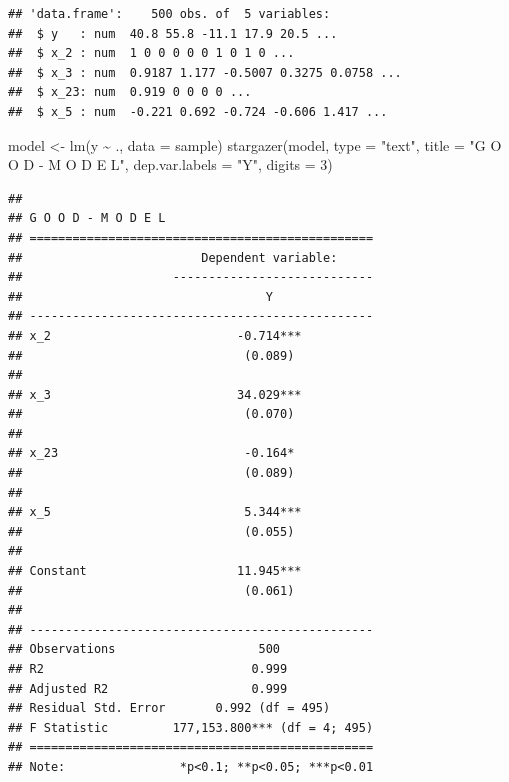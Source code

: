 \documentclass[
]{book}
\newenvironment{Shaded}{\begin{snugshade}}{\end{snugshade}}
\newcommand{\AttributeTok}[1]{\textcolor[rgb]{0.77,0.63,0.00}{#1}}
\newcommand{\DecValTok}[1]{\textcolor[rgb]{0.00,0.00,0.81}{#1}}
\newcommand{\FunctionTok}[1]{\textcolor[rgb]{0.00,0.00,0.00}{#1}}
\newcommand{\NormalTok}[1]{#1}
\newcommand{\OtherTok}[1]{\textcolor[rgb]{0.56,0.35,0.01}{#1}}
\newcommand{\SpecialCharTok}[1]{\textcolor[rgb]{0.00,0.00,0.00}{#1}}
\newcommand{\StringTok}[1]{\textcolor[rgb]{0.31,0.60,0.02}{#1}}
\begin{document}
\begin{verbatim}
## 'data.frame':    500 obs. of  5 variables:
##  $ y   : num  40.8 55.8 -11.1 17.9 20.5 ...
##  $ x_2 : num  1 0 0 0 0 0 1 0 1 0 ...
##  $ x_3 : num  0.9187 1.177 -0.5007 0.3275 0.0758 ...
##  $ x_23: num  0.919 0 0 0 0 ...
##  $ x_5 : num  -0.221 0.692 -0.724 -0.606 1.417 ...
\end{verbatim}

\begin{Shaded}
\begin{Highlighting}[]
\NormalTok{model }\OtherTok{\textless{}{-}} \FunctionTok{lm}\NormalTok{(y }\SpecialCharTok{\textasciitilde{}}\NormalTok{ ., }\AttributeTok{data =}\NormalTok{ sample)}
\FunctionTok{stargazer}\NormalTok{(model, }\AttributeTok{type =} \StringTok{"text"}\NormalTok{, }\AttributeTok{title =} \StringTok{"G O O D {-}  M O D E L"}\NormalTok{,}
          \AttributeTok{dep.var.labels =} \StringTok{"Y"}\NormalTok{,}
          \AttributeTok{digits =} \DecValTok{3}\NormalTok{)}
\end{Highlighting}
\end{Shaded}

\begin{verbatim}
## 
## G O O D - M O D E L
## ================================================
##                         Dependent variable:     
##                     ----------------------------
##                                  Y              
## ------------------------------------------------
## x_2                          -0.714***          
##                               (0.089)           
##                                                 
## x_3                          34.029***          
##                               (0.070)           
##                                                 
## x_23                          -0.164*           
##                               (0.089)           
##                                                 
## x_5                           5.344***          
##                               (0.055)           
##                                                 
## Constant                     11.945***          
##                               (0.061)           
##                                                 
## ------------------------------------------------
## Observations                    500             
## R2                             0.999            
## Adjusted R2                    0.999            
## Residual Std. Error       0.992 (df = 495)      
## F Statistic         177,153.800*** (df = 4; 495)
## ================================================
## Note:                *p<0.1; **p<0.05; ***p<0.01
\end{verbatim}
\end{document}
